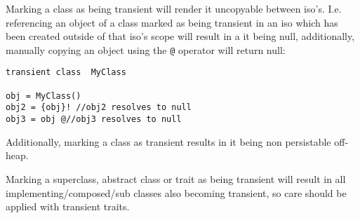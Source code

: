 \documentclass[conc-doc]{subfiles}
\begin{document}
Marking a class as being transient will render it uncopyable between iso's. I.e. referencing an object of a class marked as being transient in an iso which has been created outside of that iso's scope will result in a it being null, additionally, manually copying an object using the \lstinline{@} operator will return null:

\begin{lstlisting}
transient class  MyClass

obj = MyClass()
obj2 = {obj}! //obj2 resolves to null
obj3 = obj @//obj3 resolves to null
\end{lstlisting}

Additionally, marking a class as transient results in it being non persistable off-heap.

Marking a superclass, abstract class or trait as being transient will result in all implementing/composed/sub classes also becoming transient, so care should be applied with transient traits.
\end{document}

